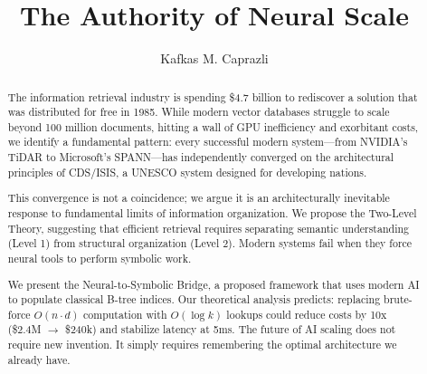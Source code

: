 \documentclass[manuscript,screen,review]{acmart}
\begin{document}
\title{The Authority of Neural Scale}

\author{Kafkas M. Caprazli}

\begin{abstract}
The information retrieval industry is spending \$4.7 billion to rediscover a solution that was distributed for free in 1985. While modern vector databases struggle to scale beyond 100 million documents, hitting a wall of GPU inefficiency and exorbitant costs, we identify a fundamental pattern: every successful modern system---from NVIDIA's TiDAR to Microsoft's SPANN---has independently converged on the architectural principles of CDS/ISIS, a UNESCO system designed for developing nations.

This convergence is not a coincidence; we argue it is an architecturally inevitable response to fundamental limits of information organization. We propose the Two-Level Theory, suggesting that efficient retrieval requires separating semantic understanding (Level 1) from structural organization (Level 2). Modern systems fail when they force neural tools to perform symbolic work.

We present the Neural-to-Symbolic Bridge, a proposed framework that uses modern AI to populate classical B-tree indices. Our theoretical analysis predicts: replacing brute-force $O(n \cdot d)$ computation with $O(\log k)$ lookups could reduce costs by 10x (\$2.4M $\rightarrow$ \$240k) and stabilize latency at 5ms. The future of AI scaling does not require new invention. It simply requires remembering the optimal architecture we already have.
\end{abstract}


\maketitle
\end{document}
